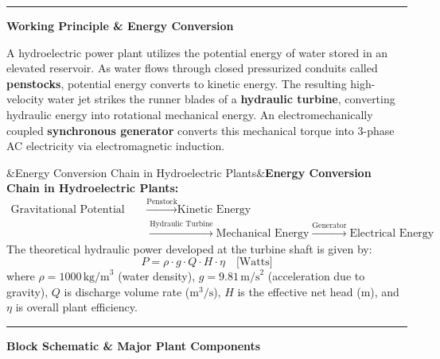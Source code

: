 \documentclass[11pt,a4paper]{article}
\newcommand{\concept}[1]{%
  \vspace{3pt}\noindent\textcolor{AnthGreen}{\rule{3.5pt}{10pt}}\enspace
  \textbf{\sffamily\color{AnthDark}#1}\par\vspace{2pt}%
}
\newenvironment{Def}[1][]{\begin{tcolorbox}[defbox]\ifx&#1&\else\textbf{\color{AnthOrange}#1:}\enspace\fi}{\end{tcolorbox}}
\begin{document}
\concept{Working Principle \& Energy Conversion}
A hydroelectric power plant utilizes the potential energy of water stored in an elevated reservoir. As water flows through closed pressurized conduits called \textbf{penstocks}, potential energy converts to kinetic energy. The resulting high-velocity water jet strikes the runner blades of a \textbf{hydraulic turbine}, converting hydraulic energy into rotational mechanical energy. An electromechanically coupled \textbf{synchronous generator} converts this mechanical torque into 3-phase AC electricity via electromagnetic induction.

\begin{Def}[Energy Conversion Chain in Hydroelectric Plants]
\begin{align*}
  \text{Gravitational Potential Energy} &\xrightarrow{\text{Penstock}} \text{Kinetic Energy} \\
  &\xrightarrow{\text{Hydraulic Turbine}} \text{Mechanical Energy} \xrightarrow{\text{Generator}} \text{Electrical Energy}
\end{align*}
The theoretical hydraulic power developed at the turbine shaft is given by:
\begin{equation}
  P = \rho \cdot g \cdot Q \cdot H \cdot \eta \quad \text{[Watts]}
\end{equation}
where $\rho = 1000\,\text{kg/m}^3$ (water density), $g = 9.81\,\text{m/s}^2$ (acceleration due to gravity), $Q$ is discharge volume rate ($\text{m}^3/\text{s}$), $H$ is the effective net head (m), and $\eta$ is overall plant efficiency.
\end{Def}

\concept{Block Schematic \& Major Plant Components}
\end{document}
